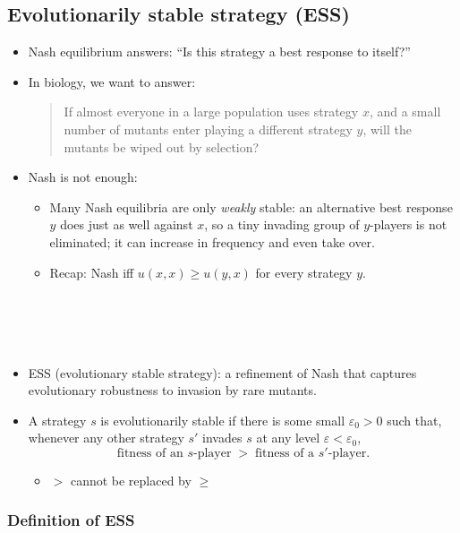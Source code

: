 \documentclass[20pt]{extarticle}
\begin{document}
\subsection*{Evolutionarily stable strategy (ESS)}

\begin{itemize}
%
\item Nash equilibrium answers: ``Is this strategy a best response to itself?''
%
\item In biology, we want to answer:
\begin{quote}
If almost everyone in a large population uses strategy $x$, and a small number of mutants enter playing a different strategy $y$, will the mutants be wiped out by selection?
\end{quote}
%
\item Nash is not enough:
	\begin{itemize}
	\item Many Nash equilibria are only \emph{weakly} stable: an alternative best response $y$ does just as well against $x$, so a tiny invading group of $y$-players is not eliminated; it can increase in frequency and even take over.
	\item Recap: Nash iff $u(x,x) \ge u(y,x)$ for every strategy $y$.
	\ \\
	\ \\
	\ \\
	\ \\
	\ \\
	\end{itemize}
%
\item ESS (evolutionary stable strategy): a refinement of Nash that captures evolutionary robustness to invasion by rare mutants.
%
\end{itemize}

\begin{itemize}
\item A strategy $s$ is evolutionarily stable if there is some small $\varepsilon_0 > 0$ such that, whenever any other strategy $s'$ invades $s$ at any level $\varepsilon < \varepsilon_0$,
\[ \text{fitness of an $s$-player} \;>\; \text{fitness of a $s'$-player}. \]
	\begin{itemize}
	\item $>$ cannot be replaced by $\ge$
	\end{itemize}
\end{itemize}

\subsubsection*{Definition of ESS}
\end{document}

